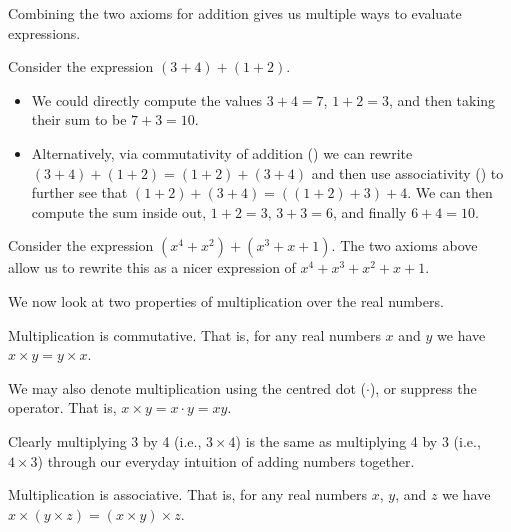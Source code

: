 Combining the two axioms for addition gives us multiple ways to evaluate expressions.

\begin{example}
    Consider the expression $(3 + 4) + (1 + 2)$.
    \begin{itemize}
        \item We could directly compute the values $3 + 4 = 7$, $1 + 2 = 3$, and then taking their sum to be $7 + 3 = 10$.
        \item Alternatively, via commutativity of addition () we can rewrite $(3 + 4) + (1 + 2) = (1+2)+(3+4)$ and then use associativity () to further see that $(1+2)+(3+4) = ((1+2)+3)+4$. We can then compute the sum inside out, $1 + 2 = 3$, $3 + 3 = 6$, and finally $6 + 4 = 10$.
    \end{itemize}
\end{example}

\begin{example}
    Consider the expression $(x^4 + x^2) + (x^3 + x + 1)$. The two axioms above allow us to rewrite this as a nicer expression of $x^4 + x^3 + x^2 + x + 1$.
\end{example}

We now look at two properties of multiplication over the real numbers.

\begin{axiom}\label{axiom-multiplication-is-commutative}
    Multiplication is commutative. That is, for any real numbers $x$ and $y$ we have $x \times y = y \times x$.
\end{axiom}
\begin{remark}
    We may also denote multiplication using the centred dot ($\cdot$), or suppress the operator. That is, $x\times y = x\cdot y = xy$.
\end{remark}

\begin{example}
    Clearly multiplying 3 by 4 (i.e., $3 \times 4$) is the same as multiplying 4 by 3 (i.e., $4 \times 3$) through our everyday intuition of adding numbers together.
\end{example}

\begin{axiom}\label{axiom-multiplication-is-associative}
    Multiplication is associative. That is, for any real numbers $x$, $y$, and $z$ we have $x\times(y\times z) = (x\times y)\times z$.
\end{axiom}

